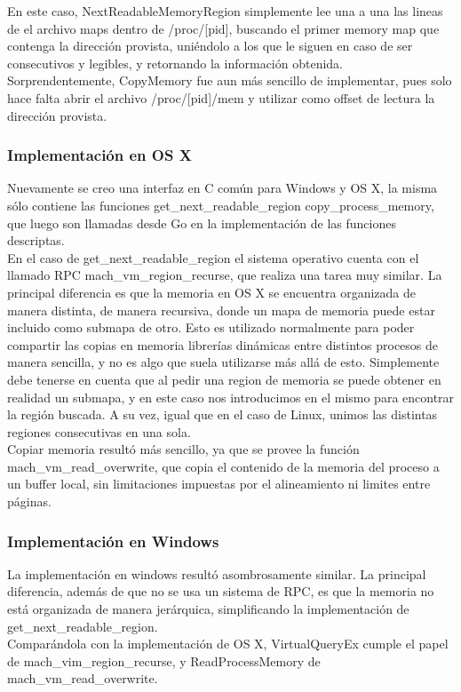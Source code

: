 En este caso, NextReadableMemoryRegion simplemente lee una a una las lineas de
el archivo maps dentro de /proc/[pid], buscando el primer memory map que
contenga la dirección provista, uniéndolo a los que le siguen en caso de ser
consecutivos y legibles, y retornando la información obtenida.\\

Sorprendentemente, CopyMemory fue aun más sencillo de implementar, pues solo
hace falta abrir el archivo /proc/[pid]/mem y utilizar como offset de lectura
la dirección provista.\\

\subsubsection{Implementación en OS X}

Nuevamente se creo una interfaz en C común para Windows y OS X, la misma sólo
contiene las funciones get\_next\_readable\_region copy\_process\_memory, que
luego son llamadas desde Go en la implementación de las funciones descriptas.\\

En el caso de get\_next\_readable\_region el sistema operativo cuenta con el
llamado RPC mach\_vm\_region\_recurse, que realiza una tarea muy similar. La
principal diferencia es que la memoria en OS X se encuentra organizada de
manera distinta, de manera recursiva, donde un mapa de memoria puede estar
incluido como submapa de otro. Esto es utilizado normalmente para poder
compartir las copias en memoria librerías dinámicas entre distintos procesos de
manera sencilla, y no es algo que suela utilizarse más allá de esto.
Simplemente debe tenerse en cuenta que al pedir una region de memoria se puede
obtener en realidad un submapa, y en este caso nos introducimos en el mismo
para encontrar la región buscada. A su vez, igual que en el caso de Linux,
unimos las distintas regiones consecutivas en una sola.\\

Copiar memoria resultó más sencillo, ya que se provee la función
mach\_vm\_read\_overwrite, que copia el contenido de la memoria del proceso a
un buffer local, sin limitaciones impuestas por el alineamiento ni limites
entre páginas.

\subsubsection{Implementación en Windows}

La implementación en windows resultó asombrosamente similar. La principal
diferencia, además de que no se usa un sistema de RPC, es que la memoria no
está organizada de manera jerárquica, simplificando la implementación de
get\_next\_readable\_region.\\

Comparándola con la implementación de OS X, VirtualQueryEx cumple el papel de
mach\_vim\_region\_recurse, y ReadProcessMemory de mach\_vm\_read\_overwrite.\\
